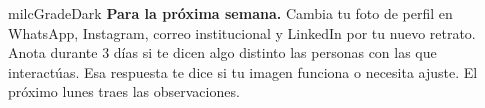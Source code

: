 \documentclass[11pt,letterpaper]{article}
\begin{document}
\begin{infoband}{milcGradeDark}
\textbf{Para la próxima semana.} Cambia tu foto de perfil en WhatsApp, Instagram, correo institucional y LinkedIn por tu nuevo retrato. Anota durante 3 días si te dicen algo distinto las personas con las que interactúas. Esa respuesta te dice si tu imagen funciona o necesita ajuste. El próximo lunes traes las observaciones.
\end{infoband}
\end{document}
